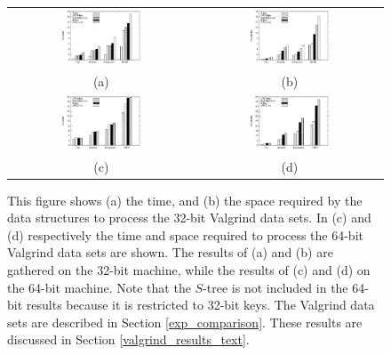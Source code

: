 \documentclass[]{acmtrans2m}
\begin{document}
\begin{figure}
\center
\begin{tabular}{cc}
\includegraphics[width=0.45\textwidth]{plots/knuth_valgrind_time.eps} & \includegraphics[width=0.45\textwidth]{plots/knuth_valgrind_mem.eps}\\
(a) & (b)\\
\includegraphics[width=0.45\textwidth]{plots/athena_valgrind_time.eps} & \includegraphics[width=0.45\textwidth]{plots/athena_valgrind_mem.eps}\\
(c) & (d)\\
\end{tabular}
\caption{This figure shows (a) the time, and (b) the space required by the
data structures to process the 32-bit Valgrind data sets. In (c) and (d) respectively
the time and space required to process the 64-bit Valgrind data sets are shown.
The results of (a) and (b) are gathered on the 32-bit machine, while the results
of (c) and (d) on the 64-bit machine. Note that the $S$-tree is not included in the 64-bit results
because it is restricted to 32-bit keys. The Valgrind data sets are described in Section \ref{exp_comparison}.
These results are discussed in Section \ref{valgrind_results_text}.}
\label{valgrind_results}
\end{figure}
\end{document}
